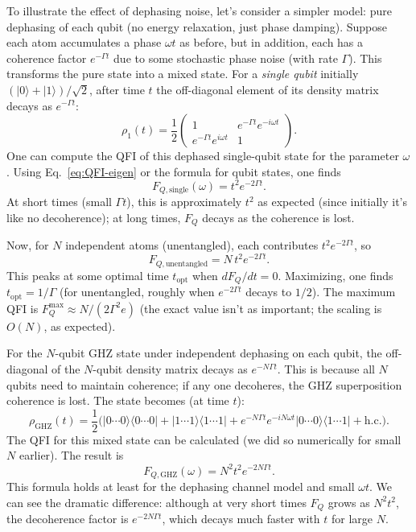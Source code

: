 To illustrate the effect of dephasing noise, let’s consider a simpler
model: pure dephasing of each qubit (no energy relaxation, just phase
damping). Suppose each atom accumulates a phase $\omega t$ as before,
but in addition, each has a coherence factor $e^{-\Gamma t}$ due to
some stochastic phase noise (with rate $\Gamma$). This transforms the
pure state into a mixed state. For a \emph{single qubit} initially
$(|0\rangle+|1\rangle)/\sqrt{2}$, after time $t$ the off-diagonal
element of its density matrix decays as $e^{-\Gamma t}$:
\[
\rho_1(t) = \frac{1}{2}\begin{pmatrix}1 & e^{-\Gamma t} e^{-i \omega t} \\ e^{-\Gamma t} e^{i \omega t} & 1\end{pmatrix}.
\]
One can compute the QFI of this dephased single-qubit state for the parameter $\omega$. Using Eq.~\eqref{eq:QFI-eigen} or the formula for qubit states, one finds
\[
F_{Q, \text{single}}(\omega) = t^2 e^{-2\Gamma t}.
\]
At short times (small $\Gamma t$), this is approximately $t^2$ as expected (since initially it’s like no decoherence); at long times, $F_Q$ decays as the coherence is lost.



Now, for $N$ independent atoms (unentangled), each contributes $t^2 e^{-2\Gamma t}$, so
\[
F_{Q,\text{unentangled}} = N\, t^2 e^{-2\Gamma t}.
\]
This peaks at some optimal time $t_{\text{opt}}$ when $dF_Q/dt = 0$. Maximizing, one finds $t_{\text{opt}} = 1/\Gamma$ (for unentangled, roughly when $e^{-2\Gamma t}$ decays to $1/2$). The maximum QFI is $F_Q^{\max} \approx N/(2\Gamma^2 e)$ (the exact value isn’t as important; the scaling is $O(N)$, as expected).



For the $N$-qubit GHZ state under independent dephasing on each qubit,
the off-diagonal of the $N$-qubit density matrix decays as $e^{-N
  \Gamma t}$. This is because all $N$ qubits need to maintain
coherence; if any one decoheres, the GHZ superposition coherence is
lost. The state becomes (at time $t$):
\[
\rho_{\text{GHZ}}(t) = \frac{1}{2}\Big(|0\cdots0\rangle\langle 0\cdots0| + |1\cdots1\rangle\langle 1\cdots1| + e^{-N\Gamma t} e^{-i N \omega t}|0\cdots0\rangle\langle 1\cdots1| + \text{h.c.}\Big).
\]
The QFI for this mixed state can be calculated (we did so numerically for small $N$ earlier). The result is
\[
F_{Q,\text{GHZ}}(\omega) = N^2 t^2 e^{-2 N \Gamma t}.
\]
This formula holds at least for the dephasing channel model and small $\omega t$. We can see the dramatic difference: although at very short times $F_Q$ grows as $N^2 t^2$, the decoherence factor is $e^{-2 N \Gamma t}$, which decays much faster with $t$ for large $N$.



